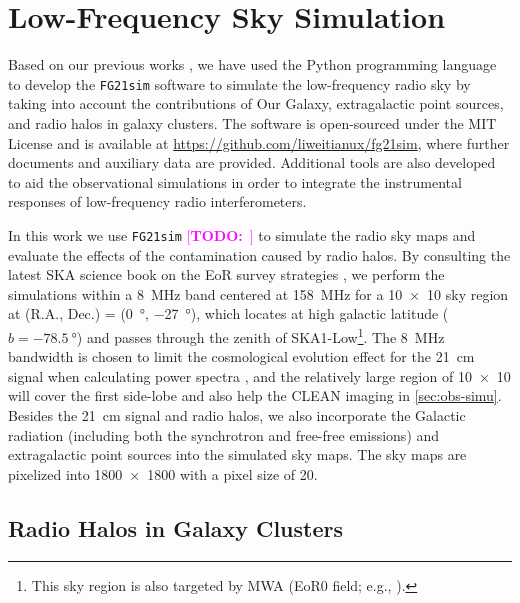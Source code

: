 \documentclass[modern]{aastex62}
\newcommand{\TODO}[1]{\textcolor{magenta}{[\textbf{TODO:}~\uuline{#1}]}}
\begin{document}
\section{Low-Frequency Sky Simulation}
\label{sec:sky-simu}

Based on our previous works \citep{wang2010,wang2013}, we have used the
Python programming language to develop the \texttt{FG21sim} software to
simulate the low-frequency radio sky by taking into account the
contributions of Our Galaxy, extragalactic point sources, and radio halos
in galaxy clusters.
The software is open-sourced under the MIT License and is available at
\url{https://github.com/liweitianux/fg21sim},
where further documents and auxiliary data are provided.
Additional tools are also developed to aid the observational simulations
in order to integrate the instrumental responses of low-frequency radio
interferometers.

In this work we use \texttt{FG21sim} \TODO{version ???} to simulate the
radio sky maps and evaluate the effects of the contamination caused by
radio halos.
By consulting the latest SKA science book on the EoR survey strategies
\citep[e.g.,][]{koopmans2015rev}, we perform the simulations within
a \SI{8}{\MHz} band centered at \SI{158}{\MHz} for a \SI{10 x 10}{\deg}
sky region at (R.A., Dec.) = (\SI{0}{\degree}, \SI{-27}{\degree}),
which locates at high galactic latitude ($b = \SI{-78.5}{\degree}$)
and passes through the zenith of SKA1-Low\footnote{%
  This sky region is also targeted by MWA (EoR0 field;
  e.g., \citealt{beardsley2016}).}.
The \SI{8}{\MHz} bandwidth is chosen to limit the cosmological evolution
effect for the 21~cm signal when calculating power spectra
\citep[e.g.][]{wyithe2004,thyagarajan2013},
and the relatively large region of \SI{10 x 10}{\deg} will cover the first
side-lobe and also help the CLEAN imaging in \autoref{sec:obs-simu}.
Besides the 21~cm signal and radio halos, we also incorporate the
Galactic radiation (including both the synchrotron and free-free emissions)
and extragalactic point sources into the simulated sky maps.
The sky maps are pixelized into \num{1800 x 1800} with a pixel size of
\SI{20}{\arcsec}.


\subsection{Radio Halos in Galaxy Clusters}
\label{sec:cluster-halo}
\end{document}
